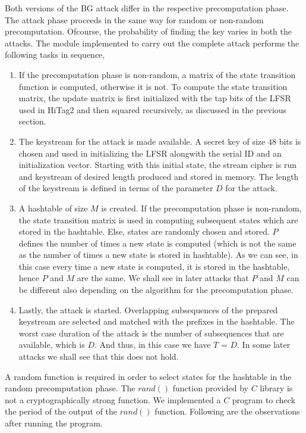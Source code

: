 Both versions of the BG attack differ in the respective precomputation phase. The attack phase proceeds in the same way for random or non-random precomputation. Ofcourse, the probability of finding the key varies in both the attacks. The module implemented to carry out the complete attack performs the following tasks in sequence,
\begin{enumerate}
\item If the precomputation phase is non-random, a matrix of the state transition function is computed, otherwise it is not. To compute the state transition matrix, the update matrix is first initialized with the tap bits of the LFSR used in HiTag2 and then squared recursively, as discussed in the previous section.
\item The keystream for the attack is made available. A secret key of size $48$ bits is chosen and used in initializing the LFSR alongwith the serial ID and an initialization vector. Starting with this initial state, the stream cipher is run and keystream of desired length produced and stored in memory. The length of the keystream is defined in terms of the parameter $D$ for the attack.
\item A hashtable of size $M$ is created. If the precomputation phase is non-random, the state transition matrix is used in computing subsequent states which are stored in the hashtable. Else, states are randomly chosen and stored. $P$ defines the number of times a new state is computed (which is not the same as the number of times a new state is stored in hashtable). As we can see, in this case every time a new state is computed, it is stored in the hashtable, hence $P$ and $M$ are the same. We shall see in later attacks that $P$ and $M$ can be different also depending on the algorithm for the precomputation phase. 
\item Lastly, the attack is started. Overlapping subsequences of the prepared keystream are selected and matched with the prefixes in the hashtable. The worst case duration of the attack is the number of subsequences that are available, which is $D$. And thus, in this case we have $T$ = $D$. In some later attacks we shall see that this does not hold. 
\end{enumerate}


A random function is required in order to select states for the hashtable in the random precomputation phase. The $rand()$ function provided by $C$ library is not a cryptographically strong function. We implemented a $C$ program to check the period of the output of the $rand()$ function. Following are the observations after running the program.

